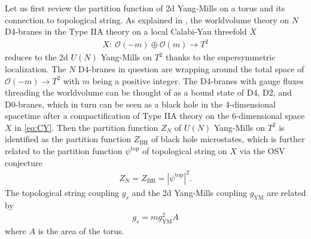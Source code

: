 \documentclass[11pt]{article}
\renewcommand{\[}{\begin{eqnarray}}
\renewcommand{\]}{\end{eqnarray}}
\begin{document}
Let us first review the partition function of
2d Yang-Mills on a torus and its connection to topological string.
As explained in \cite{Vafa:2004qa},
the worldvolume theory on $N$ D4-branes in the Type IIA theory on a local Calabi-Yau
threefold $X$
\begin{align}
X:~ \mathcal{O}(-m)\oplus \mathcal{O}(m)\to T^2
\label{eq:CY}
\end{align}
reduces to the 2d $U(N)$ Yang-Mills on $T^2$ thanks to the supersymmetric localization.
The $N$ D4-branes in question are wrapping around the total space
of $\mathcal{O}(-m)\to T^2$ with $m$ being a positive integer. 
The D4-branes with gauge fluxes threading the worldvolume  can be thought of as a bound state
of D4, D2, and D0-branes, which in turn can be seen as 
a black hole in the 4-dimensional spacetime
after a compactification of Type IIA theory on the 6-dimensional space
$X$ in \eqref{eq:CY}.
Then the partition function $Z_N$ of $U(N)$ Yang-Mills on $T^2$
is identified as the partition function $Z_{\text{BH}}$
of black hole microstates, which is further 
related to the partition function $\psi^{\text{top}}$
of topological string on $X$
via the OSV conjecture \cite{Ooguri:2004zv}
\begin{align}
 Z_N=Z_{\text{BH}}=|\psi^{\text{top}}|^2.
\label{eq:OSV}
\end{align} 
The topological string coupling $g_s$
and the 2d Yang-Mills coupling $g_{\text{YM}}$ are related by
\begin{align}
 g_s=mg_{\text{YM}}^2A
\end{align} 
where $A$ is the area of the torus.
\end{document}
